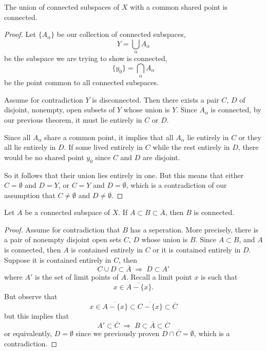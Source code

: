 \begin{thm}%
The union of connected subspaces of $X$ with a common shared
point is connected.
\end{thm}
\begin{proof}
Let $\{A_{\alpha}\}$ be our collection of connected subspaces,
\begin{equation}%
Y=\bigcup_{\alpha} A_{\alpha}
\end{equation}
be the subspace we are trying to show is connected,
\begin{equation}%
\{y_0\} = \bigcap_{\alpha}A_{\alpha} 
\end{equation}
be the point common to all connected subspaces.

Assume for contradiction $Y$ is disconnected. Then there exists a
pair $C$, $D$ of disjoint, nonempty, open subsets of $Y$ whose
union is $Y$. Since $A_\alpha$ is connected, by our previous
theorem, it must lie entirely in $C$ or $D$. 

Since all $A_\alpha$ share a common point, it implies that all
$A_\alpha$ lie entirely in $C$ or they all lie entirely in
$D$. If some lived entirely in $C$ while the rest entirely in
$D$, there would be no shared point $y_0$ since $C$ and $D$ are
disjoint. 

So it follows that their union lies entirely in one. But this
means that either $C=\emptyset$ and $D=Y$, or $C=Y$ and
$D=\emptyset$, which is a contradiction of our assumption that
$C\neq\emptyset$ and $D\neq\emptyset$.
\end{proof}
\begin{thm}%
Let $A$ be a connected subspace of $X$. If $A\subset
B\subset\overline{A}$, then $B$ is connected.
\end{thm}
\begin{proof}
Assume for contradiction that $B$ has a seperation. More
precisely, there is a pair of nonempty disjoint open sets $C$,
$D$ whose union is $B$. Since $A\subset B$, and $A$ is connected,
then $A$ is contained entirely in $C$ or it is contained entirely
in $D$. Suppose it is contained entirely in $C$, then
\begin{equation}%
C\cup D\subset \overline{A}\;\Rightarrow\; D \subset A'
\end{equation}
where $A'$ is the set of limit points of $A$. Recall a limit
point $x$ is such that 
\begin{equation}%
x\in\overline{A-\{x\}}.
\end{equation}
But observe that
\begin{equation}%
x\in\overline{A-\{x\}}\subset \overline{C-\{x\}}\subset\overline{C}
\end{equation}
but this implies that
\begin{equation}%
A'\subset\overline{C}\; \Rightarrow\; B\subset\overline{A}\subset\overline{C}
\end{equation}
or equivalently, $D=\emptyset$ since we previously proven
$D\cap\overline{C}=\emptyset$, which is a contradiction.
\end{proof}
